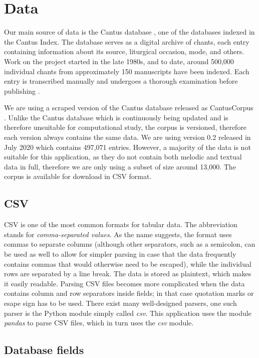 \chapter{Data}

Our main source of data is the Cantus database \citep{cantus_db}, one of the databases indexed in the Cantus Index. The database serves as a 
digital archive of chants, each entry containing information about its source, liturgical occasion, mode, and others. Work on the project started
in the late 1980s, and to date, around 500,000 individual chants from approximately 150 manuscripts have been indexed. Each entry is transcribed 
manually and undergoes a thorough examination before publishing \citep{cantus_lacoste}.

We are using a scraped version of the Cantus database released as CantusCorpus \citep{chant21}. Unlike the Cantus database which is continuously being
updated and is therefore unsuitable for computational study, the corpus is versioned, therefore each version always contains the same data. We are using
version 0.2 released in July 2020 which contains 497,071 entries. However, a majority of the data is not suitable for this application, as they do not
contain both melodic and textual data in full, therefore we are only using a subset of size around 13,000. The corpus is available for download in CSV format.

\section{CSV}

CSV is one of the most common formats for tabular data. The abbreviation stands for \emph{comma-separated values}. As the name suggests, the format
uses commas to separate columns (although other separators, such as a semicolon, can be used as well to allow for simpler parsing in case that the data 
frequently contains commas that would otherwise need to be escaped), while the individual rows are separated by a line break. The data is stored as plaintext,
which makes it easily readable. Parsing CSV files becomes more complicated when the data contains column and row separators inside fields; in that case
quotation marks or esape sign has to be used. There exist many well-designed parsers, one such parser is the Python module simply called \emph{csv}.
This application uses the module \emph{pandas} to parse CSV files, which in turn uses the \emph{csv} module.

\section{Database fields}

